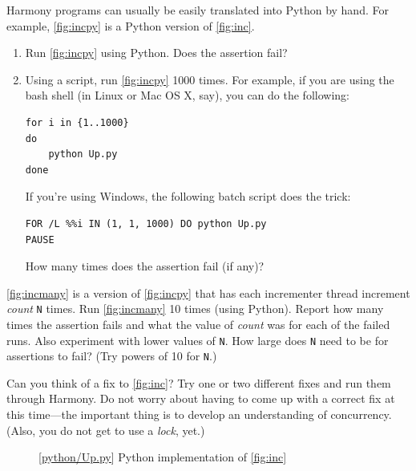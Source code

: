 \documentclass{report}
\newcommand{\harmonylink}[1]{%
[\href{https://harmony.cs.cornell.edu/#1}{\underline{#1}}]%
}
\newenvironment{code}{
\tcolorbox
}{
\endtcolorbox
}
\begin{document}
\begin{problems}
\item Harmony programs can usually be easily translated into
Python by hand.  For example,
\autoref{fig:incpy} is a Python version of \autoref{fig:inc}.
\begin{enumerate}
\item Run \autoref{fig:incpy} using Python.  Does the assertion fail?
\item Using a script, run \autoref{fig:incpy} 1000 times.
For example, if you are using the bash shell (in Linux or Mac OS X, say), you can do the following:
\begin{code}
\begin{verbatim}
for i in {1..1000}
do
    python Up.py
done
\end{verbatim}
\end{code}
If you're using Windows, the following batch script does the trick:
\begin{code}
\begin{verbatim}
FOR /L %%i IN (1, 1, 1000) DO python Up.py
PAUSE
\end{verbatim}
\end{code}
How many times does the assertion fail (if any)?
\end{enumerate}
\item \autoref{fig:incmany} is a version of \autoref{fig:incpy} that has each
incrementer thread increment \textit{count} \texttt{N} times.  Run \autoref{fig:incmany}
10 times (using Python).
Report how many times the assertion fails and what the value of \textit{count}
was for each of the failed runs.
Also experiment with lower values of \texttt{N}.
How large does \texttt{N} need to be for assertions to fail?
(Try powers of 10 for \texttt{N}.)
\item Can you think of a fix to \autoref{fig:inc}?  Try one or two different fixes
and run them through Harmony.  Do not worry about having to come up with a correct fix at this
time---the important thing is to develop an understanding of concurrency.
(Also, you do not get to use a \emph{lock}, yet.)
\end{problems}

\begin{figure}
\begin{code}
\end{code}
\caption{\harmonylink{python/Up.py} Python implementation of \autoref{fig:inc}}
\label{fig:incpy}
\end{figure}
\end{document}
